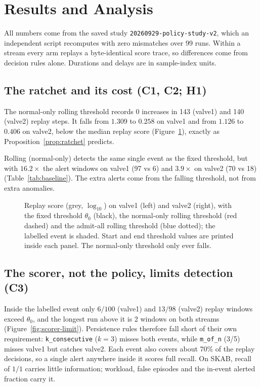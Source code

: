 \section{Results and Analysis}\label{sec:results}

All numbers come from the saved study \texttt{20260929-policy-study-v2}, which an
independent script recomputes with zero mismatches over 99 runs. Within a stream every
arm replays a byte-identical score trace, so differences come from decision rules alone.
Durations and delays are in sample-index units.

\subsection{The ratchet and its cost (C1, C2; H1)}\label{sec:results-ratchet}
The normal-only rolling threshold records 0 increases in 143 (valve1) and 140 (valve2)
replay steps. It falls from $1.309$ to $0.258$ on valve1 and from $1.126$ to $0.406$ on
valve2, below the median replay score (Figure~\ref{fig:ratchet}), exactly as
Proposition~\ref{prop:ratchet} predicts.

Rolling (normal-only) detects the same single event as the fixed threshold, but with
$16.2\times$ the alert windows on valve1 (97 vs 6) and $3.9\times$ on valve2 (70 vs 18)
(Table~\ref{tab:baseline}). The extra alerts come from the falling threshold, not from
extra anomalies.

\begin{figure}[tbp]
  \centering
  \resizebox{0.9\linewidth}{!}{}
  \caption{Replay score (grey, $\log_{10}$) on valve1 (left) and valve2 (right), with
  the fixed threshold $\theta_0$ (black), the normal-only rolling threshold (red dashed)
  and the admit-all rolling threshold (blue dotted); the labelled event is shaded. Start
  and end threshold values are printed inside each panel. The normal-only threshold only
  ever falls.}
  \label{fig:ratchet}
\end{figure}

\subsection{The scorer, not the policy, limits detection (C3)}\label{sec:results-scorer}
Inside the labelled event only $6/100$ (valve1) and $13/98$ (valve2) replay windows
exceed $\theta_0$, and the longest run above it is 2 windows on both streams
(Figure~\ref{fig:scorer-limit}). Persistence rules therefore fall short of their own
requirement: \texttt{k\_consecutive} ($k=3$) misses both events, while \texttt{m\_of\_n}
(3/5) misses valve1 but catches valve2. Each event also covers about 70\% of the replay
decisions, so a
single alert anywhere inside it scores full recall. On SKAB, recall of $1/1$ carries
little information; workload, false episodes and the in-event alerted fraction carry it.

